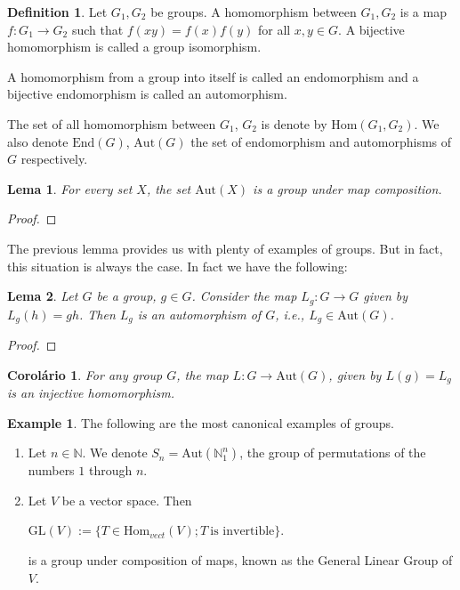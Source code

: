 \documentclass[]{article}
\newtheorem{lemma}{Lema}[section]
\newtheorem{coro}{Corolário}[section]
\theoremstyle{definition}
\newtheorem{definition}{Definition}[section]
\theoremstyle{definition}
\newtheorem{exmp}{Example}[section]
\newcommand{\raw}{\rightarrow}
\newcommand{\ie}{\textit{i.e.}}
\begin{document}
\begin{definition}
	Let $G_1, G_2$ be groups. A homomorphism between $G_1, G_2$ is a map $f:G_1 \raw G_2$ such that $f(xy)=f(x)f(y)$ for all $x,y \in G$. A bijective homomorphism is called a group isomorphism. 
	
	A homomorphism from a group into itself is called an endomorphism and a bijective endomorphism is called an automorphism. 
	
	The set of all homomorphism between $G_1$, $G_2$ is denote by $\text{Hom}(G_1, G_2)$. We also denote $\text{End}(G)$, $\text{Aut}(G)$ the set of endomorphism and automorphisms of $G$ respectively.
\end{definition}

\begin{lemma}
	For every set $X$, the set $\text{Aut}(X)$ is a group under map composition.
\end{lemma}

\begin{proof}
	
	
\end{proof}

The previous lemma provides us with plenty of examples of groups. But in fact, this situation is always the case. In fact we have the following:

\begin{lemma}
	Let $G$ be a group, $g \in G$. Consider the map $L_g:G \raw G$ given by $L_g(h)=gh$. Then $L_g$ is an automorphism of $G$, \ie, $L_g \in \text{Aut}(G)$.
\end{lemma}

\begin{proof}
	
\end{proof}

\begin{coro}
	For any group $G$, the map $L:G \raw \text{Aut}(G)$, given by $L(g) = L_g$ is an injective homomorphism.
\end{coro}

\begin{exmp}
	The following are the most canonical examples of groups. 
	
	\begin{enumerate}
		\item Let $n \in \mathbb{N}$. We denote $S_n = \text{Aut}(\mathbb{N}_1^n)$, the group of permutations of the numbers $1$ through $n$.
		
		\item 	Let $V$ be a vector space. Then 
		
		\begin{center}
			$\text{GL}(V) := \{T \in \text{Hom}_{vect}(V); T\  \text{is invertible} \}$.
		\end{center}
		
		\noindent is a group under composition of maps, known as the General Linear Group of $V$.			
	\end{enumerate}
\end{exmp}
\end{document}
